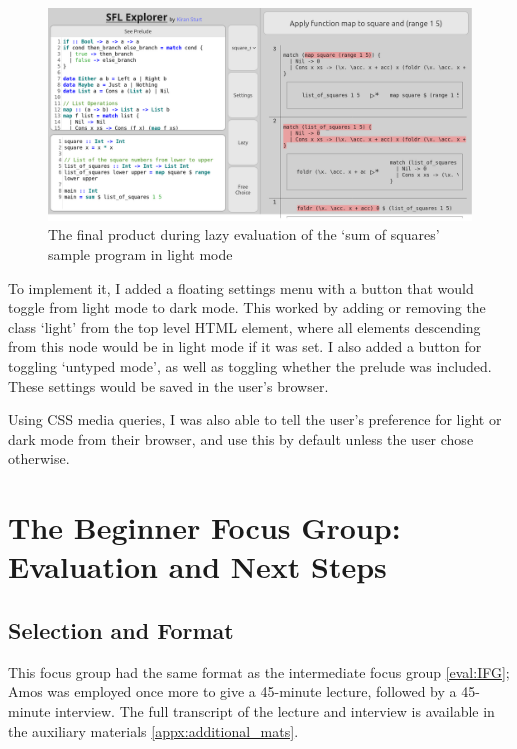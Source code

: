 \begin{figure}[h]
    \centering
    \includegraphics[width=\linewidth]{images/final_light_3.png} 
    \captionsetup{justification=centering}
    \caption{The final product during lazy evaluation of the `sum of squares' sample program in light mode}
    \label{fig:screenshot_final_light_1}
\end{figure}

To implement it, I added a floating settings menu with a button that would toggle from light mode to dark mode. This worked by adding or removing the class `light' from the top level HTML element, where all elements descending from this node would be in light mode if it was set. I also added a button for toggling `untyped mode', as well as toggling whether the prelude was included. These settings would be saved in the user's browser.

Using CSS media queries, I was also able to tell the user's preference for light or dark mode from their browser, and use this by default unless the user chose otherwise. 


\section{The Beginner Focus Group: Evaluation and Next Steps}
\label{eval:BFG}
\subsection{Selection and Format}
This focus group had the same format as the intermediate focus group \ref{eval:IFG}; Amos was employed once more to give a 45-minute lecture, followed by a 45-minute interview. The full transcript of the lecture and interview is available in the auxiliary materials \ref{appx:additional_mats}.

